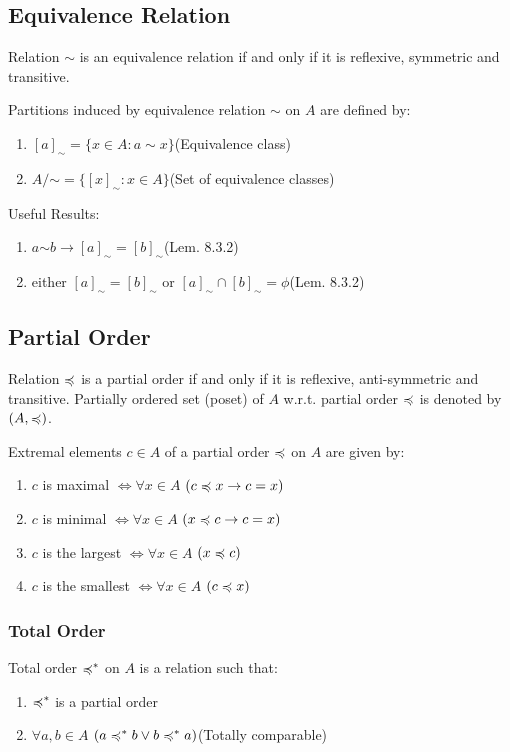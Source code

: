 \documentclass[12pt, a4paper]{article}
\begin{document}
\begin{multicols*}{3}
\subsection{Equivalence Relation}
Relation $\sim$ is an equivalence relation if and only if it is reflexive, symmetric and transitive.

Partitions induced by equivalence relation $\sim$ on $A$ are defined by:
\begin{enumerate}[\roman*.]
  \item $[a]_{\sim} = \{x \in A : a \sim x\}$\hfill(Equivalence class)
  \item $A/\mathord{\sim} = \{[x]_{\sim} : x \in A\}$\hfill(Set of equivalence classes)
\end{enumerate}

Useful Results:
\begin{enumerate}[\roman*.]
  \item $a\mathord{\sim}b \rightarrow [a]_{\sim} = [b]_{\sim}$\hfill(Lem. 8.3.2)
  \item either $[a]_{\sim} = [b]_{\sim}$ or $[a]_{\sim} \cap [b]_{\sim} = \phi$\hfill(Lem. 8.3.2)
\end{enumerate}

\colbreak
\subsection{Partial Order}
Relation $\preccurlyeq$ is a partial order if and only if it is reflexive, anti-symmetric and transitive. Partially ordered set (poset) of $A$ w.r.t. partial order $\preccurlyeq$ is denoted by $(A, \preccurlyeq)$.

Extremal elements $c \in A$ of a partial order $\preccurlyeq$ on $A$ are given by:
\begin{enumerate}[\roman*.]
  \item $c$ is maximal $\iff \forall x \in A$ $(c \preccurlyeq x \rightarrow c=x)$
  \item $c$ is minimal $\iff \forall x \in A$ $(x \preccurlyeq c \rightarrow c=x)$
  \item $c$ is the largest $\iff \forall x \in A$ $(x \preccurlyeq c)$
  \item $c$ is the smallest $\iff \forall x \in A$ $(c \preccurlyeq x)$
\end{enumerate}

\subsubsection{Total Order}
Total order $\preccurlyeq^*$ on $A$ is a relation such that:
\begin{enumerate}[\roman*.]
  \item $\preccurlyeq^*$ is a partial order
  \item $\forall a,b \in A$ $(a\preccurlyeq^*b \lor b\preccurlyeq^*a)$\hfill(Totally comparable)
\end{enumerate}


\end{multicols*}
\end{document}
